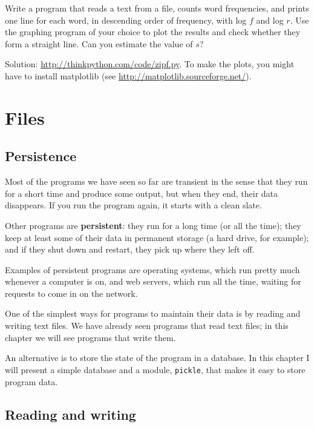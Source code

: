 \documentclass[10pt]{book}
\begin{document}
\begin{CJK}{UTF8}{gbsn}
\begin{exercise}
Write a program that reads a text from a file, counts
word frequencies, and prints one line
for each word, in descending order of frequency, with
log $f$ and log $r$.  Use the graphing program of your
choice to plot the results and check whether they form
a straight line.  Can you estimate the value of $s$?

Solution: \url{http://thinkpython.com/code/zipf.py}.  To make the plots, you
might have to install matplotlib (see
\url{http://matplotlib.sourceforge.net/}).

\end{exercise}


\chapter{Files}


\section{Persistence}

Most of the programs we have seen so far are transient in the
sense that they run for a short time and produce some output,
but when they end, their data disappears.  If you run the program
again, it starts with a clean slate.

Other programs are {\bf persistent}: they run for a long time
(or all the time); they keep at least some of their data
in permanent storage (a hard drive, for example); and
if they shut down and restart, they pick up where they left off.

Examples of persistent programs are operating systems, which
run pretty much whenever a computer is on, and web servers,
which run all the time, waiting for requests to come in on
the network.

One of the simplest ways for programs to maintain their data
is by reading and writing text files.  We have already seen
programs that read text files; in this chapter we will see programs
that write them.

An alternative is to store the state of the program in a database.
In this chapter I will present a simple database and a module,
{\tt pickle}, that makes it easy to store program data.


\section{Reading and writing}


\end{CJK}
\end{document}
